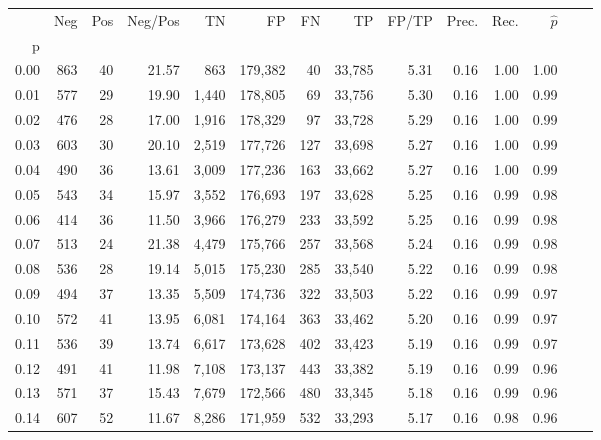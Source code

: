 \begin{tabular}{rrrrrrrrrrrrrr}
\toprule
{} &    Neg &    Pos & Neg/Pos &       TN &       FP &      FN &      TP & FP/TP & Prec. &  Rec. & $\hat{p}$ \\
p    &        &        &         &          &          &         &         &       &       &       &           \\
\midrule
0.00 &    863 &     40 &   21.57 &      863 &  179,382 &      40 &  33,785 &  5.31 &  0.16 &  1.00 &      1.00 \\
0.01 &    577 &     29 &   19.90 &    1,440 &  178,805 &      69 &  33,756 &  5.30 &  0.16 &  1.00 &      0.99 \\
0.02 &    476 &     28 &   17.00 &    1,916 &  178,329 &      97 &  33,728 &  5.29 &  0.16 &  1.00 &      0.99 \\
0.03 &    603 &     30 &   20.10 &    2,519 &  177,726 &     127 &  33,698 &  5.27 &  0.16 &  1.00 &      0.99 \\
0.04 &    490 &     36 &   13.61 &    3,009 &  177,236 &     163 &  33,662 &  5.27 &  0.16 &  1.00 &      0.99 \\
0.05 &    543 &     34 &   15.97 &    3,552 &  176,693 &     197 &  33,628 &  5.25 &  0.16 &  0.99 &      0.98 \\
0.06 &    414 &     36 &   11.50 &    3,966 &  176,279 &     233 &  33,592 &  5.25 &  0.16 &  0.99 &      0.98 \\
0.07 &    513 &     24 &   21.38 &    4,479 &  175,766 &     257 &  33,568 &  5.24 &  0.16 &  0.99 &      0.98 \\
0.08 &    536 &     28 &   19.14 &    5,015 &  175,230 &     285 &  33,540 &  5.22 &  0.16 &  0.99 &      0.98 \\
0.09 &    494 &     37 &   13.35 &    5,509 &  174,736 &     322 &  33,503 &  5.22 &  0.16 &  0.99 &      0.97 \\
0.10 &    572 &     41 &   13.95 &    6,081 &  174,164 &     363 &  33,462 &  5.20 &  0.16 &  0.99 &      0.97 \\
0.11 &    536 &     39 &   13.74 &    6,617 &  173,628 &     402 &  33,423 &  5.19 &  0.16 &  0.99 &      0.97 \\
0.12 &    491 &     41 &   11.98 &    7,108 &  173,137 &     443 &  33,382 &  5.19 &  0.16 &  0.99 &      0.96 \\
0.13 &    571 &     37 &   15.43 &    7,679 &  172,566 &     480 &  33,345 &  5.18 &  0.16 &  0.99 &      0.96 \\
0.14 &    607 &     52 &   11.67 &    8,286 &  171,959 &     532 &  33,293 &  5.17 &  0.16 &  0.98 &      0.96 \\

\end{tabular}
